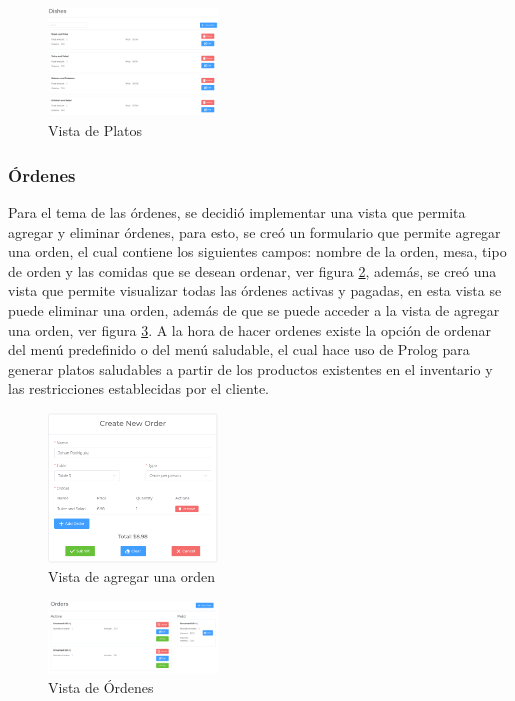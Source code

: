\begin{figure}[H]
    \centering
    \includegraphics[width=0.4\textwidth]{assets/dishes.png}
    \caption{Vista de Platos}
    \label{fig:dishes}
\end{figure}

\subsubsection{Órdenes}

Para el tema de las órdenes, se decidió implementar una vista que permita 
agregar y eliminar órdenes, para esto, se creó un formulario que permite 
agregar una orden, el cual contiene los siguientes campos: nombre de la orden, 
mesa, tipo de orden y las comidas que se desean ordenar, ver figura \ref{fig:orders_add},
además, se creó una vista que permite visualizar todas las órdenes 
activas y pagadas, en esta vista se puede eliminar una orden, además de 
que se puede acceder a la vista de agregar una orden, ver figura 
\ref{fig:orders}. A la hora de hacer ordenes existe la opción de ordenar del 
menú predefinido o del menú saludable, el cual hace uso de Prolog para 
generar platos saludables a partir de los productos existentes en el 
inventario y las restricciones establecidas por el cliente.

\begin{figure}[H]
    \centering
    \includegraphics[width=0.4\textwidth]{assets/orders_add.png}
    \caption{Vista de agregar una orden}
    \label{fig:orders_add}
\end{figure}

\begin{figure}[H]
    \centering
    \includegraphics[width=0.4\textwidth]{assets/orders.png}
    \caption{Vista de Órdenes}
    \label{fig:orders}
\end{figure}

